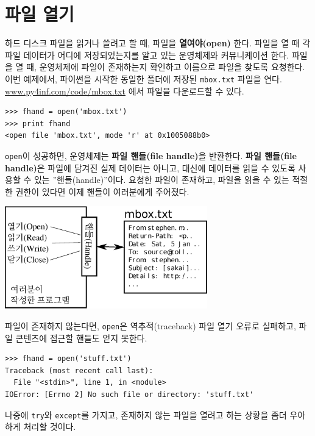 \section{파일 열기}

하드 디스크 파일을 읽거나 쓸려고 할 때, 파일을 {\bf 열여야(open)} 한다.
파일을 열 때 각 파일 데이터가 어디에 저장되었는지를 알고 있는 운영체제와 커뮤니케이션 한다.
파일을 열 때, 운영체제에 파일이 존재하는지 확인하고 이름으로 파일을 찾도록 요청한다.     
이번 예제에서, 파이썬을 시작한 동일한 폴더에 저장된 {\tt mbox.txt} 파일을 연다.  
\url{www.py4inf.com/code/mbox.txt} 에서 파일을 다운로드할 수 있다.

\beforeverb
\begin{verbatim}
>>> fhand = open('mbox.txt')
>>> print fhand
<open file 'mbox.txt', mode 'r' at 0x1005088b0>
\end{verbatim}
\afterverb
%

{\tt open}이 성공하면, 운영체제는 {\bf 파일 핸들(file handle)}을 반환한다.
{\bf 파일 핸들(file handle)}은 파일에 담겨진 실제 데이터는 아니고, 
대신에 데이터를 읽을 수 있도록 사용할 수 있는 ''핸들(handle)''이다.
요청한 파일이 존재하고, 파일을 읽을 수 있는 적절한 권한이 있다면 이제 핸들이 여러분에게 주어졌다.

\beforefig
\centerline{\includegraphics[height=1.75in]{figs2/handle.eps}}
\afterfig

파일이 존재하지 않는다면, {\tt open}은 역추적(traceback) 파일 열기 오류로 실패하고, 파일 콘텐츠에 접근할 핸들도 얻지 못한다.

\beforeverb
\begin{verbatim}
>>> fhand = open('stuff.txt')
Traceback (most recent call last):
  File "<stdin>", line 1, in <module>
IOError: [Errno 2] No such file or directory: 'stuff.txt'
\end{verbatim}
\afterverb
%

나중에 {\tt try}와 {\tt except}를 가지고, 존재하지 않는 파일을 열려고 하는 상황을 좀더 우아하게 처리할 것이다.


